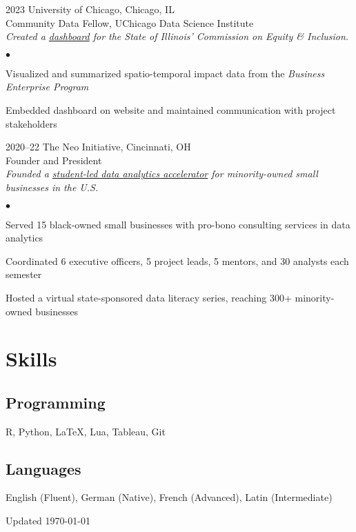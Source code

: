 \documentclass[11pt,letterpaper]{report}
\newenvironment{list2}{
  \begin{list}{\tiny$\bullet$}{%
      \setlength{\itemsep}{0in}
      \setlength{\parsep}{0in} \setlength{\parskip}{0in}
      \setlength{\topsep}{0in} \setlength{\partopsep}{0in} 
      \setlength{\leftmargin}{0.2in}}}{\end{list}}
\begin{document}
\begin{tablist}
\item[2023] \tab{}University of Chicago, Chicago, IL\\ 
Community Data Fellow, UChicago Data Science Institute\\  
\emph{Created a \href{https://public.tableau.com/app/profile/daniel.posmik/viz/DSI_CEI_Dashboard_draft/Dashboard1}{dashboard} for the State of Illinois' Commission on Equity \& Inclusion.}

\vspace*{.05in}  
\begin{list2}
\item Visualized and summarized spatio-temporal impact data from the \textit{Business Enterprise Program}
\item Embedded dashboard on website and maintained communication with project stakeholders
\end{list2}

\item[2020--22] \tab{}The Neo Initiative, Cincinnati, OH\\ 
Founder and President\\  
\emph{Founded a \href{https://www.linkedin.com/company/neo-initiative/}{student-led data analytics accelerator} for minority-owned small businesses in the U.S.} 

\vspace*{.05in}  
\begin{list2}
\item Served 15 black-owned small businesses with pro-bono consulting services in data analytics
\item Coordinated 6 executive officers, 5 project leads, 5 mentors, and 30 analysts each semester
\item Hosted a virtual state-sponsored data literacy series, reaching 300+ minority-owned businesses
\end{list2}
\end{tablist}

\section*{Skills}

\subsection*{Programming}
R, Python, LaTeX, Lua, Tableau, Git 

\subsection*{Languages}
English (Fluent), German (Native), French (Advanced), Latin (Intermediate)\\

\begin{center}
  \vfill
  Updated \monthyeardate\today
\end{center}
\end{document}
